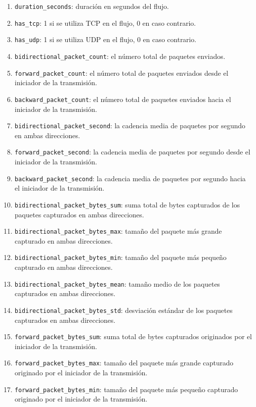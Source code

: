 \begin{enumerate}
  \item \texttt{duration\_seconds}: duración en segundos del flujo.
  \item \texttt{has\_tcp}: 1 si se utiliza TCP en el flujo, 0 en caso contrario.
  \item \texttt{has\_udp}: 1 si se utiliza UDP en el flujo, 0 en caso contrario.
  \item \texttt{bidirectional\_packet\_count}: el número total de paquetes enviados.
  \item \texttt{forward\_packet\_count}: el número total de paquetes enviados desde el iniciador de la transmisión.
  \item \texttt{backward\_packet\_count}: el número total de paquetes enviados hacia el iniciador de la transmisión.
  \item \texttt{bidirectional\_packet\_second}: la cadencia media de paquetes por segundo en ambas direcciones.
  \item \texttt{forward\_packet\_second}: la cadencia media de paquetes por segundo desde el iniciador de la transmisión.
  \item \texttt{backward\_packet\_second}: la cadencia media de paquetes por segundo hacia el iniciador de la transmisión.
  \item \texttt{bidirectional\_packet\_bytes\_sum}: suma total de bytes capturados de los paquetes capturados en ambas direcciones.
  \item \texttt{bidirectional\_packet\_bytes\_max}: tamaño del paquete más grande capturado en ambas direcciones.
  \item \texttt{bidirectional\_packet\_bytes\_min}: tamaño del paquete más pequeño capturado en ambas direcciones.
  \item \texttt{bidirectional\_packet\_bytes\_mean}: tamaño medio de los paquetes capturados en ambas direcciones.
  \item \texttt{bidirectional\_packet\_bytes\_std}: desviación estándar de los paquetes capturados en ambas direcciones.
  \item \texttt{forward\_packet\_bytes\_sum}: suma total de bytes capturados originados por el iniciador de la transmisión.
  \item \texttt{forward\_packet\_bytes\_max}: tamaño del paquete más grande capturado originado por el iniciador de la transmisión.
  \item \texttt{forward\_packet\_bytes\_min}: tamaño del paquete más pequeño capturado originado por el iniciador de la transmisión.

\end{enumerate}
